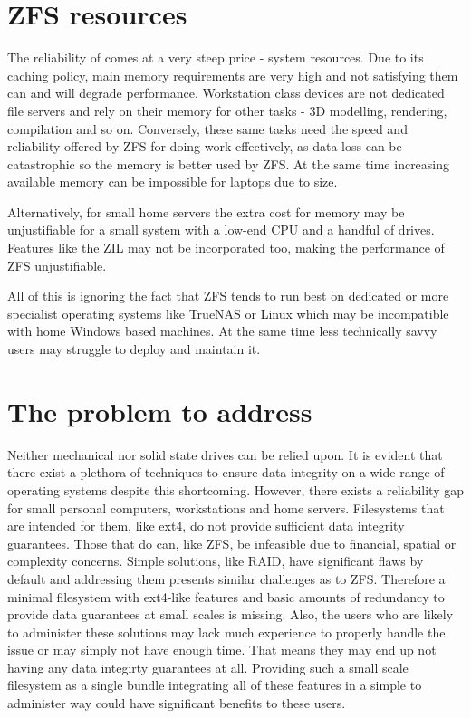     \section{ZFS resources}

        The reliability of  comes at a very steep price - system resources.
        Due to its caching policy, main memory requirements are
        very high and not satisfying them can and will degrade performance.
        Workstation class devices are not dedicated file servers and rely on
        their memory for other tasks - 3D modelling, rendering, compilation
        and so on. Conversely, these same tasks need the speed and
        reliability offered by ZFS for doing work effectively, as data loss can
        be catastrophic so the memory is better used by ZFS. At the same time
        increasing available memory can be impossible for laptops due to size.

        Alternatively, for small home servers the extra cost for memory may be
        unjustifiable for a small system with a low-end CPU and a handful of
        drives. Features like the ZIL may not be incorporated too, making the
        performance of ZFS unjustifiable.

        All of this is ignoring the fact that ZFS tends to run best on
        dedicated or more specialist operating systems like TrueNAS or Linux
        which may be incompatible with home Windows based machines. At the same time
        less technically savvy users may struggle to deploy and maintain it.

    \section{The problem to address}
        \label{sec:problem}

        Neither mechanical nor solid state drives can be relied upon. It is
        evident that there exist a plethora of techniques to ensure data
        integrity on a wide range of operating systems despite this
        shortcoming. However, there exists a reliability gap for small personal
        computers, workstations and home servers. Filesystems that are intended
        for them, like ext4, do not provide sufficient data integrity
        guarantees. Those that do can, like ZFS, be infeasible due to
        financial, spatial or complexity concerns. Simple solutions, like RAID,
        have significant flaws by default and addressing them presents similar
        challenges as to ZFS. Therefore a minimal filesystem with ext4-like
        features and basic amounts of redundancy to provide data guarantees at
        small scales is missing. Also, the users who are likely to administer
        these solutions may lack much experience to properly handle the issue
        or may simply not have enough time. That means they may end up not
        having any data integirty guarantees at all. Providing such a small
        scale filesystem as a single bundle integrating all of these features
        in a simple to administer way could have significant benefits to these
        users.
